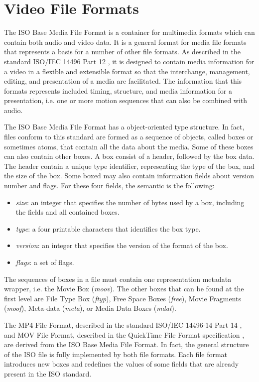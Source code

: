 \chapter{Video File Formats}


The ISO Base Media File Format is a container for multimedia formats which can contain both audio and video data. It is a general format for media file formats that represents a basis for a number of other file formats.
As described in the standard ISO/IEC 14496 Part 12 \cite{iso}, it is designed to contain media information for a video in a flexible and extensible format so that the interchange, management, editing, and presentation of a media are facilitated. The information that this formats represents included timing, structure, and media information for a presentation, i.e. one or more motion sequences that can also be combined with audio.

The ISO Base Media File Format has a object-oriented type structure. In fact, files conform to this standard are formed as a sequence of objects, called boxes or sometimes atoms, that contain all the data about the media. Some of these boxes can also contain other boxes. A box consist of a header, followed by the box data. The header contain a unique type identifier, representing the type of the box, and the size of the box. Some boxed may also contain information fields about version number and flags. For these four fields, the semantic is the following:

\begin{itemize}
\item \emph{size}: an integer that specifies the number of bytes used by a box, including the fields and all contained boxes.
\item \emph{type}: a four printable characters that identifies the box type.
\item \emph{version}: an integer that specifies the version of the format of the box.
\item \emph{flags}: a set of flags.
\end{itemize}

The sequences of boxes in a file must contain one representation metadata wrapper, i.e. the Movie Box (\emph{moov}). The other boxes that can be found at the first level are File Type Box (\emph{ftyp}), Free Space Boxes (\emph{free}), Movie Fragments (\emph{moof}), Meta-data (\emph{meta}), or Media Data Boxes (\emph{mdat}).

The MP4 File Format, described in the standard ISO/IEC 14496-14 Part 14 \cite{mp4}, and MOV File Format, described in the QuickTime File Format specification \cite{mov}, are derived from the ISO Base Media File Format. In fact, the general structure of the ISO file is fully implemented by both file formats. Each file format introduces new boxes and redefines the values of some fields that are already present in the ISO standard.

